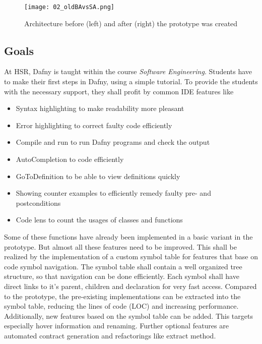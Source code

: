 \begin{figure}[ht]
    \centering
    \texttt{[image: 02\_oldBAvsSA.png]}
    \caption{Architecture before (left) and after (right) the prototype was created}
    \label{fig:oldBAvsSA}
\end{figure}


\subsection{Goals}
At HSR, Dafny is taught within the course \textit{Software Engineering}.
Students have to make their first steps in Dafny, using a simple tutorial.
To provide the students with the necessary support, they shall profit by common IDE features like
\begin{itemize}
    \item Syntax highlighting to make readability more pleasant
    \item Error highlighting to correct faulty code efficiently
    \item Compile and run to run Dafny programs and check the output
    \item AutoCompletion to code efficiently
    \item GoToDefinition to be able to view definitions quickly
    \item Showing counter examples to efficiently remedy faulty pre- and postconditions
    \item Code lens to count the usages of classes and functions
\end{itemize}

Some of these functions have already been implemented in a basic variant in the prototype.
But almost all these features need to be improved.
This shall be realized by the implementation of a custom symbol table for features that base on code symbol navigation.
The symbol table shall contain a well organized tree structure, so that navigation can be done efficiently.
Each symbol shall have direct links to it's parent, children and declaration for very fast access.
Compared to the prototype, the pre-existing implementations can be extracted into the symbol table,
reducing the lines of code (LOC) and increasing performance. \\

Additionally, new features based on the symbol table can be added.
This targets especially hover information and renaming.
Further optional features are automated contract generation and refactorings like extract method. \\

